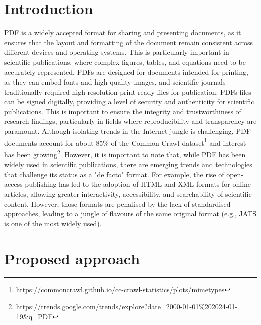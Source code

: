 \section{Introduction}

PDF is a widely accepted format for sharing and presenting documents, as it ensures that the layout and formatting of the document remain consistent across different devices and operating systems. This is particularly important in scientific publications, where complex figures, tables, and equations need to be accurately represented.
PDFs are designed for documents intended for printing, as they can embed fonts and high-quality images, and scientific journals traditionally required high-resolution print-ready files for publication. 
PDFs files can be signed digitally, providing a level of security and authenticity for scientific publications. This is important to ensure the integrity and trustworthiness of research findings, particularly in fields where reproducibility and transparency are paramount.
Although isolating trends in the Internet jungle is challenging, PDF documents account for about 85\% of the Common Crawl dataset\footnote{\url{https://commoncrawl.github.io/cc-crawl-statistics/plots/mimetypes}} and interest has been growing\footnote{\url{https://trends.google.com/trends/explore?date=2000-01-01\%202024-01-19&q=PDF}}. 
However, it is important to note that, while PDF has been widely used in scientific publications, there are emerging trends and technologies that challenge its status as a "de facto" format. For example, the rise of open-access publishing has led to the adoption of HTML and XML formats for online articles, allowing greater interactivity, accessibility, and searchability of scientific content.
However, those formats are penalised by the lack of standardised approaches, leading to a jungle of flavours of the same original format (e.g., JATS is one of the most widely used).

\section{Proposed approach}


